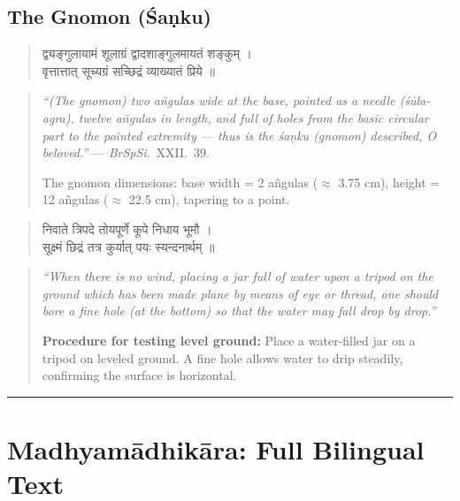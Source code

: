 \documentclass[11pt,a4paper]{article}
\newcommand{\longline}{\noindent\rule{\textwidth}{0.4pt}}
\newcommand{\dev}[1]{{\devanagarifont #1}}
\theoremstyle{definition}
\begin{document}
\subsection*{The Gnomon (\'{S}a\d{n}ku)}



\noindent
\begin{quote}
\dev{द्व्यङ्गुलायामं शूलाग्रं द्वादशाङ्गुलमायतं शङ्कुम् ।\\
वृत्तात्तात् सूच्यग्रं सच्छिद्रं व्याख्यातं प्रिये ॥}
\end{quote}

\hfill\noindent
\begin{quote}
\textit{``(The gnomon) two a\~ngulas wide at the base, pointed as a needle (\'{s}\=ula-agra), twelve a\~ngulas in length, and full of holes from the basic circular part to the pointed extremity --- thus is the \'{s}a\d{n}ku (gnomon) described, O beloved.''} --- \textit{BrSpSi}.\ XXII.\ 39.

The gnomon dimensions: base width = 2 a\~ngulas ($\approx$ 3.75 cm), height = 12 a\~ngulas ($\approx$ 22.5 cm), tapering to a point.
\end{quote}

\noindent
\begin{quote}
\dev{निवाते त्रिपदे तोयपूर्णे कूपे निधाय भूमौ ।\\
सूक्ष्मं छिद्रं तत्र कुर्यात् पयः स्यन्दनार्थम् ॥}
\end{quote}

\hfill\noindent
\begin{quote}
\textit{``When there is no wind, placing a jar full of water upon a tripod on the ground which has been made plane by means of eye or thread, one should bore a fine hole (at the bottom) so that the water may fall drop by drop.''}

\textbf{Procedure for testing level ground:} Place a water-filled jar on a tripod on leveled ground. A fine hole allows water to drip steadily, confirming the surface is horizontal.
\end{quote}



\longline

\newpage
\section{Madhyam\=adhik\=ara: Full Bilingual Text}
\label{sec:sanskrit}
\end{document}

